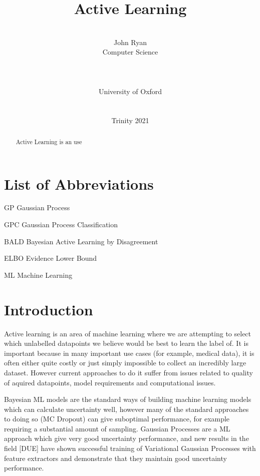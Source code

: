 \documentclass[12pt, a4paper]{report}
\date{}
\title{Active Learning}
\author{\\ \Large{John Ryan}
\\ Computer Science
\\
\\
\\
\\ University of Oxford
\\
\\ \\
Trinity 2021
}
\theoremstyle{definition}
\theoremstyle{definition}
\theoremstyle{definition}
\begin{document}

\thispagestyle{headings}
	\maketitle
\FloatBarrier
{}


\thispagestyle{empty}
\begin{abstract}

Active Learning is an use

\end{abstract}
\tableofcontents
\thispagestyle{plain}
\listoffigures
\listoftables
\listofalgocfs
\listoftheorems
\chapter*{List of Abbreviations}
\begin{abbreviations}
    \item[GP] Gaussian Process
    \item[GPC] Gaussian Process Classification
    \item[BALD] Bayesian Active Learning by Disagreement
    \item[ELBO] Evidence Lower Bound
    \item[ML] Machine Learning
\end{abbreviations}

\chapter{Introduction}

Active learning is an area of machine learning where we are attempting to select which unlabelled datapoints we believe would be best to learn the label of. It is important because in many important use cases (for example, medical data), it is often either quite costly or just simply impossible to collect an incredibly large dataset. However current approaches to do it suffer from issues related to quality of aquired datapoints, model requirements and computational issues.

Bayesian ML models are the standard ways of building machine learning models which can calculate uncertainty well, however many of the standard approaches to doing so (MC Dropout) can give suboptimal performance, for example requiring a substantial amount of sampling. Gaussian Processes are a ML approach which give very good uncertainty performance, and new results in the field [DUE] have shown successful training of Variational Gaussian Processes with feature extractors and demonstrate that they maintain good uncertainty performance.
\end{document}
